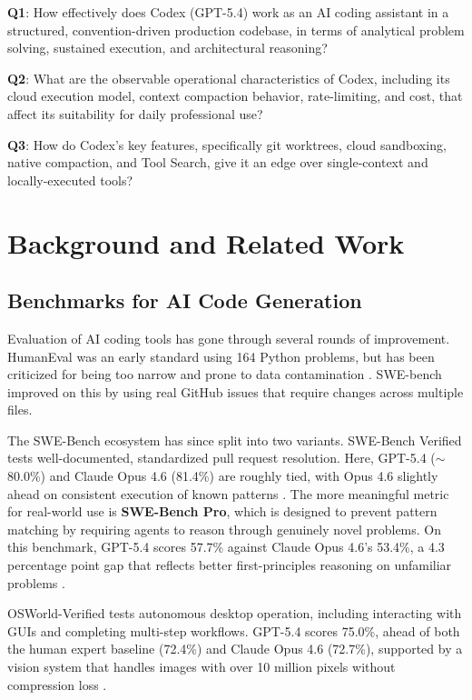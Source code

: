\documentclass[conference]{IEEEtran}
\begin{document}
\textbf{Q1}: How effectively does Codex (GPT-5.4) work as an AI coding assistant in a structured, convention-driven production codebase, in terms of analytical problem solving, sustained execution, and architectural reasoning?

\textbf{Q2}: What are the observable operational characteristics of Codex, including its cloud execution model, context compaction behavior, rate-limiting, and cost, that affect its suitability for daily professional use?

\textbf{Q3}: How do Codex's key features, specifically git worktrees, cloud sandboxing, native compaction, and Tool Search, give it an edge over single-context and locally-executed tools?

\section{Background and Related Work}

\subsection{Benchmarks for AI Code Generation}
Evaluation of AI coding tools has gone through several rounds of improvement. HumanEval \cite{chen2021evaluating} was an early standard using 164 Python problems, but has been criticized for being too narrow and prone to data contamination \cite{fryer2024hallucination}. SWE-bench \cite{jimenez2024swebench} improved on this by using real GitHub issues that require changes across multiple files.

The SWE-Bench ecosystem has since split into two variants. SWE-Bench Verified tests well-documented, standardized pull request resolution. Here, GPT-5.4 ($\sim$80.0\%) and Claude Opus 4.6 (81.4\%) are roughly tied, with Opus 4.6 slightly ahead on consistent execution of known patterns \cite{vellum2026}. The more meaningful metric for real-world use is \textbf{SWE-Bench Pro}, which is designed to prevent pattern matching by requiring agents to reason through genuinely novel problems. On this benchmark, GPT-5.4 scores 57.7\% against Claude Opus 4.6's 53.4\%, a 4.3 percentage point gap that reflects better first-principles reasoning on unfamiliar problems \cite{morphllm2026}.

OSWorld-Verified tests autonomous desktop operation, including interacting with GUIs and completing multi-step workflows. GPT-5.4 scores 75.0\%, ahead of both the human expert baseline (72.4\%) and Claude Opus 4.6 (72.7\%), supported by a vision system that handles images with over 10 million pixels without compression loss \cite{nxcode2026}.
\end{document}
